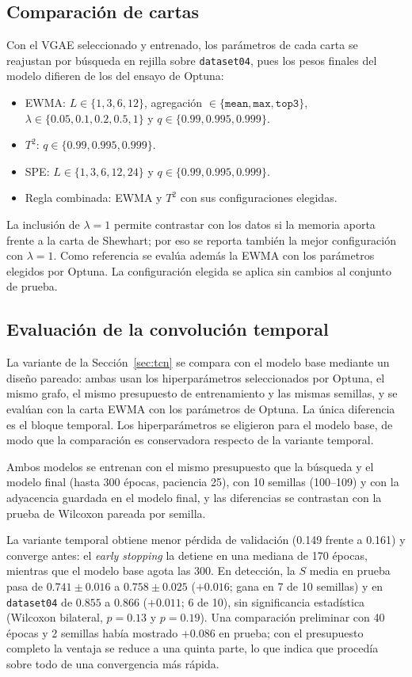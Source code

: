 \documentclass[11pt,a4paper]{article}
\begin{document}
\subsection{Comparación de cartas}

Con el VGAE seleccionado y entrenado, los parámetros de cada carta se reajustan por
búsqueda en rejilla sobre \texttt{dataset04}, pues los pesos finales del modelo
difieren de los del ensayo de Optuna:
\begin{itemize}
\item EWMA: $L\in\{1,3,6,12\}$, agregación $\in\{\texttt{mean},\texttt{max},\texttt{top3}\}$,
  $\lambda\in\{0.05,0.1,0.2,0.5,1\}$ y $q\in\{0.99,0.995,0.999\}$.
\item $T^2$: $q\in\{0.99,0.995,0.999\}$.
\item SPE: $L\in\{1,3,6,12,24\}$ y $q\in\{0.99,0.995,0.999\}$.
\item Regla combinada: EWMA y $T^2$ con sus configuraciones elegidas.
\end{itemize}
La inclusión de $\lambda=1$ permite contrastar con los datos si la memoria aporta
frente a la carta de Shewhart; por eso se reporta también la mejor configuración con
$\lambda=1$. Como referencia se evalúa además la EWMA con los parámetros elegidos por
Optuna. La configuración elegida se aplica sin cambios al
conjunto de prueba.

\subsection{Evaluación de la convolución temporal}

La variante de la Sección~\ref{sec:tcn} se compara con el modelo base mediante un
diseño pareado: ambas usan los hiperparámetros seleccionados por Optuna, el mismo
grafo, el mismo presupuesto de entrenamiento y las mismas semillas, y se evalúan con la
carta EWMA con los parámetros de Optuna. La única diferencia es el bloque temporal. Los
hiperparámetros se eligieron para el modelo base, de modo que la comparación es
conservadora respecto de la variante temporal.

Ambos modelos se entrenan con el mismo presupuesto que la búsqueda y el modelo final
(hasta 300 épocas, paciencia 25), con 10 semillas (100--109) y con la adyacencia
guardada en el modelo final, y las diferencias se contrastan con la prueba de Wilcoxon
pareada por semilla.

La variante temporal obtiene menor pérdida de validación (0.149 frente a 0.161) y
converge antes: el \emph{early stopping} la detiene en una mediana de 170 épocas,
mientras que el modelo base agota las 300. En detección, la $S$ media en prueba pasa de
$0.741\pm0.016$ a $0.758\pm0.025$ ($+0.016$; gana en 7 de 10 semillas) y en
\texttt{dataset04} de $0.855$ a $0.866$ ($+0.011$; 6 de 10), sin significancia
estadística (Wilcoxon bilateral, $p=0.13$ y $p=0.19$). Una comparación preliminar con 40
épocas y 2 semillas había mostrado $+0.086$ en prueba; con el presupuesto completo la
ventaja se reduce a una quinta parte, lo que indica que procedía sobre todo de una
convergencia más rápida.
\end{document}
